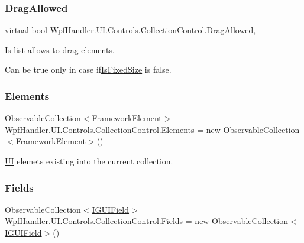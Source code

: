 \subsubsection{\texorpdfstring{Drag\+Allowed}{DragAllowed}}
{\footnotesize\ttfamily virtual bool Wpf\+Handler.\+U\+I.\+Controls.\+Collection\+Control.\+Drag\+Allowed\hspace{0.3cm}{\ttfamily [get]}, {\ttfamily [set]}}



Is list allows to drag elements. 

Can be true only in case if\mbox{\hyperlink{class_wpf_handler_1_1_u_i_1_1_controls_1_1_collection_control_aa95fcae30ed2356bfff8154bcceecc8a}{Is\+Fixed\+Size}} is false. \mbox{\label{class_wpf_handler_1_1_u_i_1_1_controls_1_1_collection_control_ade5772e31978f3f8764f50d7483d27f4}} 
\subsubsection{\texorpdfstring{Elements}{Elements}}
{\footnotesize\ttfamily Observable\+Collection$<$Framework\+Element$>$ Wpf\+Handler.\+U\+I.\+Controls.\+Collection\+Control.\+Elements = new Observable\+Collection$<$Framework\+Element$>$()\hspace{0.3cm}{\ttfamily [get]}}



\mbox{\hyperlink{namespace_wpf_handler_1_1_u_i}{UI}} elemets existing into the current collection. 

\mbox{\label{class_wpf_handler_1_1_u_i_1_1_controls_1_1_collection_control_a47291558ce667430c006d9e294f714bb}} 
\subsubsection{\texorpdfstring{Fields}{Fields}}
{\footnotesize\ttfamily Observable\+Collection$<$\mbox{\hyperlink{interface_wpf_handler_1_1_u_i_1_1_auto_layout_1_1_i_g_u_i_field}{I\+G\+U\+I\+Field}}$>$ Wpf\+Handler.\+U\+I.\+Controls.\+Collection\+Control.\+Fields = new Observable\+Collection$<$\mbox{\hyperlink{interface_wpf_handler_1_1_u_i_1_1_auto_layout_1_1_i_g_u_i_field}{I\+G\+U\+I\+Field}}$>$()\hspace{0.3cm}{\ttfamily [get]}}



